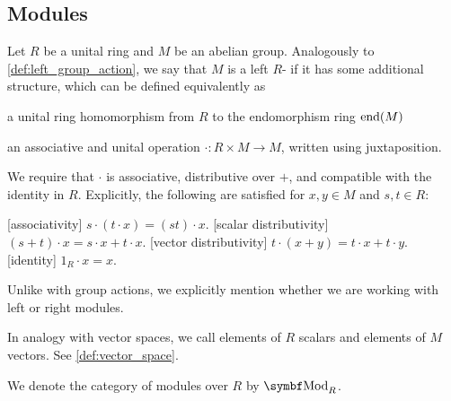 \subsection{Modules}\label{subsec:modules}

\begin{definition}\label{def:left_module}
  Let \( R \) be a unital ring and \( M \) be an abelian group. Analogously to \cref{def:left_group_action}, we say that \( M \) is a left \( R \)- if it has some additional structure, which can be defined equivalently as
  \begin{defenum}
     a unital ring homomorphism from \( R \) to the endomorphism ring \( \operatorname{end}(M) \)

    \cite[374]{Knapp2016BAlg} an associative  and unital operation \( \cdot: R \times M \to M \), written using juxtaposition.

    We require that \( \cdot \) is associative, distributive over \( + \), and compatible with the identity in \( R \). Explicitly, the following are satisfied for \( x, y \in M \) and \( s, t \in R \):
    \begin{description}
      [associativity] \( s \cdot (t \cdot x) = (s t) \cdot x \).
      [scalar distributivity] \( (s + t) \cdot x = s \cdot x + t \cdot x \).
      [vector distributivity] \( t \cdot (x + y) = t \cdot x + t \cdot y \).
      [identity] \( 1_R \cdot x = x \).
    \end{description}
  \end{defenum}

  Unlike with group actions, we explicitly mention whether we are working with left or right modules.

  In analogy with vector spaces, we call elements of \( R \) scalars and elements of \( M \) vectors. See \cref{def:vector_space}.

  We denote the category of modules over \( R \) by \( \Cat{Mod}_R \).
\end{definition}

